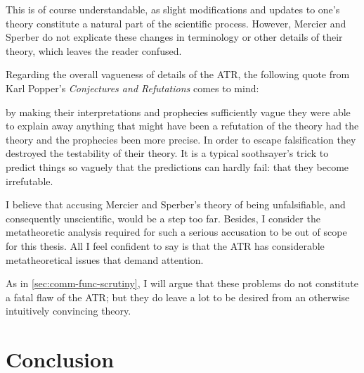This is of course understandable, as slight modifications and updates to one's theory constitute a natural part of the scientific process. However, Mercier and Sperber do not explicate these changes in terminology or other details of their theory, which leaves the reader confused.

Regarding the overall vagueness of details of the ATR, the following quote from Karl Popper's \emph{Conjectures and Refutations} comes to mind:
\begin{quoting}
    by making their interpretations and prophecies sufficiently vague they were able to explain away anything that might have been a refutation of the theory had the theory and the prophecies been more precise. In order to escape falsification they destroyed the testability of their theory. It is a typical soothsayer's trick to predict things so vaguely that the predictions can hardly fail: that they become irrefutable.
    \citep[p.~37]{Popper62}
\end{quoting}
I believe that accusing Mercier and Sperber's theory of being unfalsifiable, and consequently unscientific, would be a step too far. Besides, I consider the metatheoretic analysis required for such a serious accusation to be out of scope for this thesis. All I feel confident to say is that the ATR has considerable metatheoretical issues that demand attention.

As in \cref{sec:comm-func-scrutiny}, I will argue that these problems do not constitute a fatal flaw of the ATR; but they do leave a lot to be desired from an otherwise intuitively convincing theory.

\section{Conclusion}

